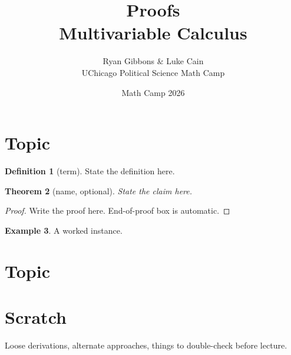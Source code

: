 \documentclass[11pt]{article}
\title{Proofs \\[0.35em] \large Multivariable Calculus}
\author{Ryan Gibbons \& Luke Cain \\ UChicago Political Science Math Camp}
\date{Math Camp 2026}
\theoremstyle{plain}
\newtheorem{theorem}{Theorem}[section]
\newtheorem{lemma}[theorem]{Lemma}
\theoremstyle{definition}
\newtheorem{definition}[theorem]{Definition}
\newtheorem{example}[theorem]{Example}
\theoremstyle{remark}
\begin{document}
\maketitle


\section{Topic}

\begin{definition}[term]
State the definition here.
\end{definition}

\begin{theorem}[name, optional]
State the claim here.
\end{theorem}

\begin{proof}
Write the proof here.  End-of-proof box is automatic.
\end{proof}

\begin{example}
A worked instance.
\end{example}


\section{Topic}



\section*{Scratch}

Loose derivations, alternate approaches, things to double-check before lecture.
\end{document}

